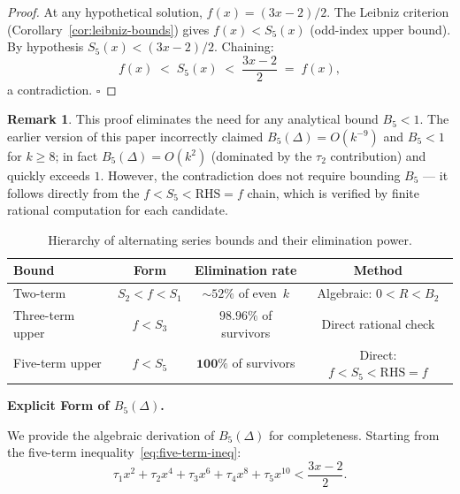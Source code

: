 \documentclass[12pt,a4paper]{article}
\theoremstyle{plain}
\theoremstyle{definition}
\newtheorem{remark}[theorem]{Remark}
\begin{document}
\begin{proof}
  At any hypothetical solution, $f(x) = (3x-2)/2$.
  The Leibniz criterion (Corollary~\ref{cor:leibniz-bounds}) gives
  $f(x) < S_5(x)$ (odd-index upper bound).
  By hypothesis $S_5(x) < (3x-2)/2$.  Chaining:
  \[
    f(x) \; < \; S_5(x) \; < \; \frac{3x-2}{2} \; = \; f(x),
  \]
  a contradiction.  \hfill$\square$
\end{proof}

\begin{remark}
  This proof eliminates the need for any analytical bound $B_5 < 1$.
  The earlier version of this paper incorrectly claimed
  $B_5(\Delta) = O(k^{-9})$ and $B_5 < 1$ for $k \ge 8$; in fact
  $B_5(\Delta) = O(k^2)$ (dominated by the $\tau_2$ contribution)
  and quickly exceeds $1$.  However, the contradiction does not
  require bounding $B_5$ --- it follows directly from the
  $f < S_5 < \mathrm{RHS} = f$ chain, which is verified by finite
  rational computation for each candidate.
\end{remark}

\begin{table}[htbp]
\centering
\caption{Hierarchy of alternating series bounds and their elimination
  power.}
\label{tab:bound-hierarchy}
\begin{tabular}{lccc}
\toprule
\textbf{Bound} & \textbf{Form} & \textbf{Elimination rate} &
\textbf{Method} \\
\midrule
Two-term & $S_2 < f < S_1$ & $\sim 52\%$ of even~$k$ &
  Algebraic: $0 < R < B_2$ \\
Three-term upper & $f < S_3$ & $98.96\%$ of survivors &
  Direct rational check \\
Five-term upper & $f < S_5$ & $\mathbf{100\%}$ of survivors &
  Direct: $f < S_5 < \mathrm{RHS} = f$ \\
\bottomrule
\end{tabular}
\end{table}

\medskip
\noindent\textbf{Explicit Form of $B_5(\Delta)$.}
\label{sec:five-term-derivation}

We provide the algebraic derivation of $B_5(\Delta)$ for completeness.
Starting from the five-term inequality~\eqref{eq:five-term-ineq}:
\[
  \tau_1 x^2 + \tau_2 x^4 + \tau_3 x^6 + \tau_4 x^8
  + \tau_5 x^{10}
  < \frac{3x-2}{2}.
\]
\end{document}
